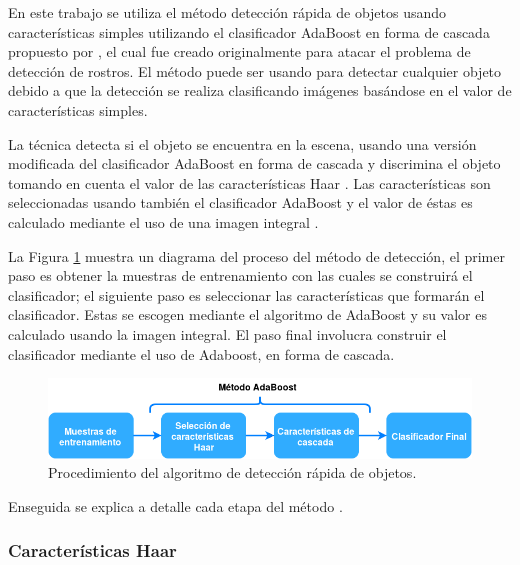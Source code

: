 En este trabajo se utiliza el método detección rápida de objetos usando características simples utilizando el clasificador AdaBoost en forma de cascada propuesto por \citep{Viola2001}, el cual fue creado originalmente para atacar el problema de detección de rostros. El método puede ser usando para detectar cualquier objeto debido a que la detección se realiza clasificando imágenes basándose en el valor de características simples.

La técnica detecta si el objeto se encuentra en la escena, usando una versión modificada del clasificador AdaBoost \citep{Freund1995} en forma de cascada y discrimina el objeto tomando en cuenta el valor de las características Haar \citep{Viola2001}. Las características son seleccionadas usando también el clasificador AdaBoost y el valor de éstas es calculado mediante el uso de una imagen integral \citep{Viola2001}. 

La Figura \ref{fig:ViolaJonesDiagram} muestra un diagrama del proceso del método de detección, el primer paso es obtener la muestras de entrenamiento con las cuales se construirá el clasificador; el siguiente paso es seleccionar las características que formarán el clasificador. Estas se escogen mediante el algoritmo de AdaBoost y su valor es calculado usando la imagen integral. El paso final  involucra construir el clasificador mediante el uso de Adaboost,  en forma de cascada.

\begin{figure}[h!]
\begin{center}
\includegraphics[scale=.6]{./Figures/ViolaJonesDiagram.png}
\end{center}
\caption{Procedimiento del algoritmo de detección rápida de objetos.}
\label{fig:ViolaJonesDiagram}
\end{figure}

Enseguida se explica a detalle cada etapa del método \citep{Viola2001}. 

\subsubsection{Características Haar}\label{sssec:CaracteristicasHaar}  

